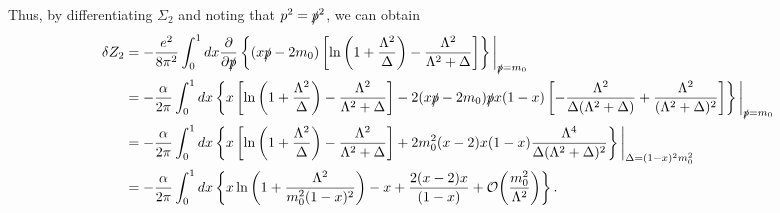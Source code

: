 \documentclass[11pt]{article}
\theoremstyle{definition}
\begin{document}
Thus, by differentiating $\Sigma_2$ and noting that $p^2 = \slashed{p}^2$, we can obtain
\begin{equation}
    \begin{aligned}
        \delta Z_2 &= -\frac{e^2}{8\pi^2}\int^1_0dx \frac{\partial}{\partial\slashed{p}}\left\{(x\slashed{p}-2m_0)\left[\ln\left(1+\frac{\Lambda^2}{\Delta}\right)-\frac{\Lambda^2}{\Lambda^2+\Delta}\right]\right\}\bigg|_{\slashed{p}=m_0}\\
        &=-\frac{\alpha}{2\pi}\int^1_0dx \left\{x\left[\ln\left(1+\frac{\Lambda^2}{\Delta}\right)-\frac{\Lambda^2}{\Lambda^2+\Delta}\right]-2(x\slashed{p}-2m_0)\slashed{p}x(1-x)\left[-\frac{\Lambda^2}{\Delta(\Lambda^2+\Delta)}+\frac{\Lambda^2}{(\Lambda^2+\Delta)^2}\right]\right\}\bigg|_{\slashed{p}=m_0}\\
        &=-\frac{\alpha}{2\pi}\int^1_0dx\left\{x\left[\ln\left(1+\frac{\Lambda^2}{\Delta}\right)-\frac{\Lambda^2}{\Lambda^2+\Delta}\right]+2m_0^2(x-2)x(1-x)\frac{\Lambda^4}{\Delta(\Lambda^2+\Delta)^2}\right\}\bigg|_{\Delta=(1-x)^2m_0^2}\\
        &=-\frac{\alpha}{2\pi}\int^1_0dx\left\{x\ln\left(1+\frac{\Lambda^2}{m_0^2(1-x)^2}\right)-x+\frac{2(x-2)x}{(1-x)}+ \order{\frac{m_0^2}{\Lambda^2}}\right\}.
    \end{aligned}
\end{equation}
\end{document}
